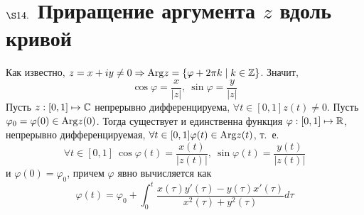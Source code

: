 \section{$\S 14.$ Приращение аргумента $z$ вдоль кривой}
Как известно, $z = x + iy \neq 0 \Rightarrow \mathrm{Arg} z = \left\{\varphi + 2 \pi k
    \mid k \in \mathbb{Z} \right\}$. Значит,
\begin{equation}\label{(14.1)}
    \cos \varphi = \frac{x}{\left| z \right|}, \ \sin \varphi = \frac{y}{\left| z \right|}
\end{equation}
\theorem
Пусть $z: [0,1] \mapsto \mathbb{C}$ непрерывно дифференцируема, $\forall t \in [0,1]
z(t)\neq 0$. Пусть $\varphi_0 = \varphi(0) \in \mathrm{Arg} z(0)$. Тогда существует и
единственна функция $\varphi: [0,1] \mapsto \mathbb{R}$, непрерывно дифференцируемая,
$\forall t \in [0,1] \varphi(t) \in \mathrm{Arg} z(t)$, т.~е.
\begin{equation}\label{(14.2)}
    \forall t \in [0,1] \ \cos \varphi(t) = \frac{x(t)}{\left| z(t) \right|}, \ \sin \varphi(t) = \frac{y(t)}{\left| z(t) \right|}
\end{equation}
и $\varphi(0) = \varphi_0$, причем $\varphi$ явно вычисляется как
\begin{equation}\label{(14.3)}
    \varphi(t) = \varphi_0 + \int_{0}^t \frac{x(\tau)y'(\tau)-y(\tau)x'(\tau)}{x^2(\tau)+y^2(\tau)}d \tau
\end{equation}
\pr
